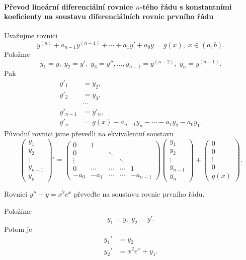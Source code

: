 \paragraph{Převod lineární diferenciální rovnice $n$-tého řádu s konstantními koeficienty
           na soustavu diferenciálních rovnic prvního řádu}

Uvažujme rovnici
\[
   y^{(n)} + a_{n-1}y^{(n-1)} + \cdots + a_1 y' + a_0 y = g(x), \; x \in (a,b).
\]
Položme 
\[
   y_1=y, \; y_2=y', \; y_3=y'', \ldots, y_{n-1} = y^{(n-2)}, \; y_{n} = y^{(n-1)}.
\]
Pak
\[
   \begin{split}
      y'_1 &= y_2,\\
      y'_2 &= y_3,\\
           &\cdots\\
      y'_{n-1} &= y'_n,\\
      y'_n &= g(x) - a_{n-1}y_n - \cdots - a_1 y_2 - a_0 y_1.
   \end{split}
\]
Původní rovnici jsme převedli na ekvivalentní soustavu
\[
   \begin{pmatrix}
      y_1 \\ y_2 \\\vdots \\ y_{n-1} \\ y_n
   \end{pmatrix}'
   =
   \begin{pmatrix}
         0 & 1 & & \\
         0 & & \ddots & & \\
         \vdots & & & \ddots & \\
         0 & \cdots & \cdots & \cdots &        1\\
      -a_0 & -a_1   & \cdots & \cdots & -a_{n-1}
   \end{pmatrix}
   \begin{pmatrix}
      y_1 \\ y_2 \\ \vdots \\ y_{n-1} \\ y_n
   \end{pmatrix}
   +
   \begin{pmatrix}
      0 \\ 0 \\ \vdots \\ 0 \\ g(x)
   \end{pmatrix}.
\]

\begin{ex}
   Rovnici $y''-y=x^2e^x$ převeďte na soustavu rovnic prvního řádu.
\end{ex}
\begin{sol}
   Položíme
   \[
      y_1 = y, \; y_2 = y'.
   \]
   Potom je
   \[
      \begin{split}
         y_1' &= y_2\\
         y_2' &= x^2e^x+y_1.
      \end{split}
   \]
\end{sol}
